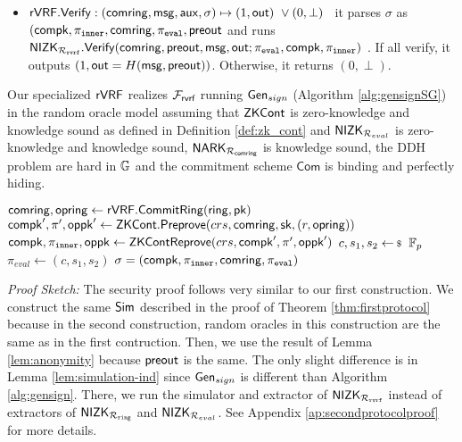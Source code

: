 \begin{itemize}
	\item  ${\mathsf{rVRF}}.{\mathsf{Verify}} : (\mathsf{comring},\mathsf{msg},\mathsf{aux},\sigma) \mapsto (1,{\mathsf{out}}) \,\, \lor (0,\perp)$ \,
	it parses $\sigma$ as $(\mathsf{compk}, \pi_{\mathtt{inner}},\mathsf{comring}, \pi_{\mathtt{eval}}, {\mathsf{preout}}$ and runs  ${\mathsf{NIZK}}_{\mathcal{R}_{\mathtt{rvrf}}}.{\mathsf{Verify}}(\mathsf{comring}, {\mathsf{preout}}, \mathsf{msg}, {\mathsf{out}}; \pi_{\mathtt{eval}},\mathsf{compk}, \pi_{\mathtt{inner}})$  . If all verify, it outputs $ (1,{\mathsf{out}} = H(\mathsf{msg},{\mathsf{preout}})) $. Otherwise, it returns $ (0,\perp) $.
\end{itemize}




\begin{theorem}\label{thm:rvrfspecial}
	Our specialized $ {\mathsf{rVRF}} $   realizes $ \mathcal{F}_{\textsf{rvrf}} $ running $ \mathsf{Gen}_{sign} $ (Algorithm \ref{alg:gensignSG}) \cite{canetti1,canetti2} in the random oracle model assuming that ${\mathsf{ZKCont}} $ is zero-knowledge and knowledge sound as defined in Definition \ref{def:zk_cont} and $ {\mathsf{NIZK}}_{\mathcal{R}_{eval}} $ is zero-knowledge and knowledge sound, $ \mathsf{NARK}_{\mathcal{R}_{\mathsf{comring}}} $ is knowledge sound, the DDH problem are hard in $ {\mathbb{G}}  $  and the commitment scheme $ \mathsf{Com} $ is binding and perfectly hiding. 
\end{theorem}
\begin{algorithm}
	\eprint{}{\scriptsize}
	\caption{$\Gen_{sign}(\ring, \sk= (x,r),\pk,\aux,\msg)$}
	\label{alg:gensignSG}	 	
	\begin{algorithmic}[1]
		\State $ \mathsf{comring}, \mathsf{opring} \leftarrow {\ensuremath{\mathsf{rVRF}}}.{\mathsf{CommitRing}}(\mathsf{ring}, \mathsf{pk}) $
		\State $ \mathsf{compk}', \pi', \mathsf{oppk}' \leftarrow {\ensuremath{\mathsf{ZKCont}}}.{\mathsf{Preprove}}(crs, \mathsf{comring},\mathsf{sk},(r,\mathsf{opring})) $
		\State $ \mathsf{compk}, \pi_{\mathtt{inner}}, \mathsf{oppk} \leftarrow {\ensuremath{\mathsf{ZKCont}}}{\ensuremath{\mathsf{Reprove}}}(crs, \mathsf{compk}',\pi',\mathsf{oppk}') $ 
		\State $ c,s_1, s_2 \leftsample \F_p $
		\State $ \pi_{eval}  \leftarrow (c,s_1, s_2)$		
		\State\Return$ \sigma = (\mathsf{compk}, \pi_{\mathtt{inner}},\mathsf{comring}, \pi_{\mathtt{eval}}) $
	\end{algorithmic}
	
\end{algorithm}

\noindent \textit{Proof Sketch:}  The security proof follows very similar to our first construction.
We construct the same $ \mathsf{Sim} $ described in the proof of Theorem \ref{thm:firstprotocol} because in the second construction, random oracles in this construction are the same as in the first contruction. Then, we use the result of Lemma \ref{lem:anonymity} because $ {\mathsf{preout}} $ is the same. The only slight difference is in Lemma \ref{lem:simulation-ind} since $ \mathsf{Gen}_{sign} $ is different than Algorithm \ref{alg:gensign}. There, we run the simulator and extractor of $ {\mathsf{NIZK}}_{\mathcal{R}_{\mathtt{rvrf}}} $  instead of extractors of  $ {\mathsf{NIZK}}_{\mathcal{R}_{\mathtt{ring}}} $ and $ {\mathsf{NIZK}}_{\mathcal{R}_{eval}} $. See Appendix \ref{ap:secondprotocolproof} for more details.



